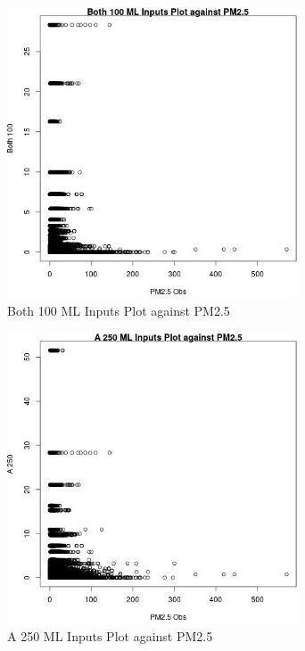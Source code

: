 \begin{figure} 
\centering  
\includegraphics[width=0.77\textwidth]{Code_Outputs/ML_input_report_ML_input_PM25_Step5_part_d_de_duplicated_aves_ML_input_Both_100vPM25_Obs.jpg} 
\caption{\label{fig:ML_input_report_ML_input_PM25_Step5_part_d_de_duplicated_aves_ML_inputBoth_100vPM25_Obs}Both 100 ML Inputs Plot against PM2.5} 
\end{figure} 
 

\begin{figure} 
\centering  
\includegraphics[width=0.77\textwidth]{Code_Outputs/ML_input_report_ML_input_PM25_Step5_part_d_de_duplicated_aves_ML_input_A_250vPM25_Obs.jpg} 
\caption{\label{fig:ML_input_report_ML_input_PM25_Step5_part_d_de_duplicated_aves_ML_inputA_250vPM25_Obs}A 250 ML Inputs Plot against PM2.5} 
\end{figure} 
 


